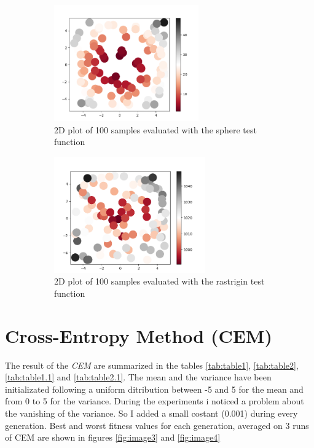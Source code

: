 \documentclass{article}
\begin{document}
\begin{figure}[h]
	
	\begin{subfigure}{0.5\textwidth}
		\includegraphics[width=0.9\linewidth, height=5cm]{sphere_dots.PNG} 
		\caption{2D plot of 100 samples evaluated with the sphere test function}
		\label{fig:subim3}
	\end{subfigure}
	\begin{subfigure}{0.5\textwidth}
		\includegraphics[width=0.9\linewidth, height=5cm]{rastrigin_dots.PNG}
		\caption{2D plot of 100 samples evaluated with the rastrigin test function}
		\label{fig:subim4}
	\end{subfigure}
	\caption{ }
	\label{fig:image2}
\end{figure}



\section{Cross-Entropy Method (CEM)}
The result of the \textit{CEM} are summarized in the tables \ref{tab:table1}, \ref{tab:table2}, \ref{tab:table1.1} and \ref{tab:table2.1}. The mean and the variance have been initializated following a uniform ditribution between -5 and 5 for the mean and from 0 to 5 for the variance. During the experiments i noticed a problem about the vanishing of the variance. So I added a small costant (0.001) during every generation. Best and worst fitness values for each generation, averaged on 3 runs of CEM are shown in figures \ref{fig:image3} and \ref{fig:image4}\\
\end{document}
